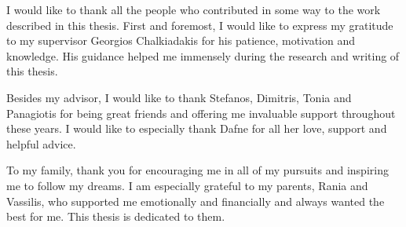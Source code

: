 \documentclass[
11pt, %
onehalfspacing, %
headsepline, %
]{MastersDoctoralThesis} %
\begin{document}
%
\begin{acknowledgements}
\addchaptertocentry{\acknowledgementname} %

I would like to thank all the people who contributed in some way to the work described in this
thesis. First and foremost, I would like to express my gratitude to my supervisor Georgios Chalkiadakis for his patience, motivation and knowledge. His guidance helped me immensely during the research and writing of this thesis. 

Besides my advisor, I would like to thank Stefanos, Dimitris, Tonia and Panagiotis for being great friends and offering me invaluable support throughout these years. I would like to especially thank Dafne for all her love, support and helpful advice.

To my family, thank you for encouraging me in all
of my pursuits and inspiring me to follow my dreams. I am especially grateful to my parents, Rania and Vassilis, who supported me emotionally and financially and always wanted the best for me. This thesis is dedicated to them.
\end{acknowledgements}


\tableofcontents %

\listoffigures %

\listoftables %



\end{document}
